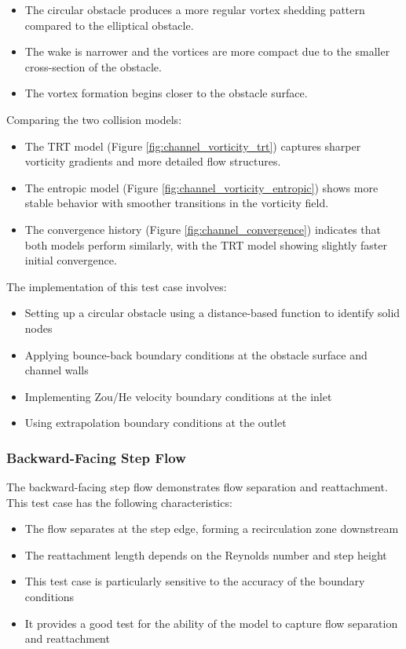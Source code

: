 \documentclass[12pt,a4paper]{article}
\begin{document}
\begin{itemize}
    \item The circular obstacle produces a more regular vortex shedding pattern compared to the elliptical obstacle.
    \item The wake is narrower and the vortices are more compact due to the smaller cross-section of the obstacle.
    \item The vortex formation begins closer to the obstacle surface.
\end{itemize}

Comparing the two collision models:
\begin{itemize}
    \item The TRT model (Figure \ref{fig:channel_vorticity_trt}) captures sharper vorticity gradients and more detailed flow structures.
    \item The entropic model (Figure \ref{fig:channel_vorticity_entropic}) shows more stable behavior with smoother transitions in the vorticity field.
    \item The convergence history (Figure \ref{fig:channel_convergence}) indicates that both models perform similarly, with the TRT model showing slightly faster initial convergence.
\end{itemize}

The implementation of this test case involves:
\begin{itemize}
    \item Setting up a circular obstacle using a distance-based function to identify solid nodes
    \item Applying bounce-back boundary conditions at the obstacle surface and channel walls
    \item Implementing Zou/He velocity boundary conditions at the inlet
    \item Using extrapolation boundary conditions at the outlet
\end{itemize}

\subsubsection{Backward-Facing Step Flow}
The backward-facing step flow demonstrates flow separation and reattachment. This test case has the following characteristics:

\begin{itemize}
    \item The flow separates at the step edge, forming a recirculation zone downstream
    \item The reattachment length depends on the Reynolds number and step height
    \item This test case is particularly sensitive to the accuracy of the boundary conditions
    \item It provides a good test for the ability of the model to capture flow separation and reattachment
\end{itemize}
\end{document}
